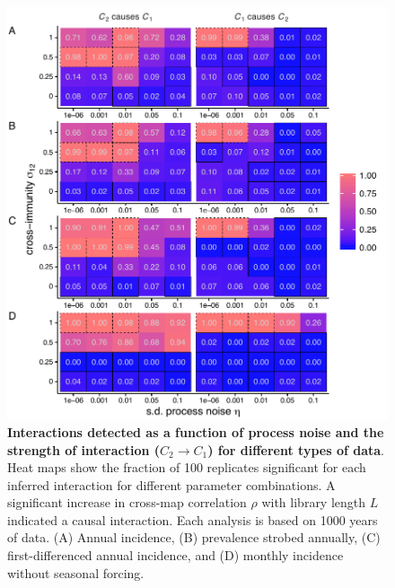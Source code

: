\begin{figure}%
\begin{center}
  \includegraphics[width=6in]{dataflow/out/fig_detect_diffdata/fig_detect_diffdata.pdf}
  \end{center}
  \caption{\textbf{Interactions detected as a function of process noise and the strength of interaction ($C_2 \rightarrow C_1$) for different types of data}. Heat maps show the fraction of 100 replicates significant for each inferred interaction for different parameter combinations. A significant increase in cross-map correlation $\rho$ with library length $L$ indicated a causal interaction. Each analysis is based on 1000 years of data. (A) Annual incidence, (B) prevalence strobed annually, (C) first-differenced annual incidence, and (D) monthly incidence without seasonal forcing.  \label{fig:detect_diffdata}}
\end{figure}


